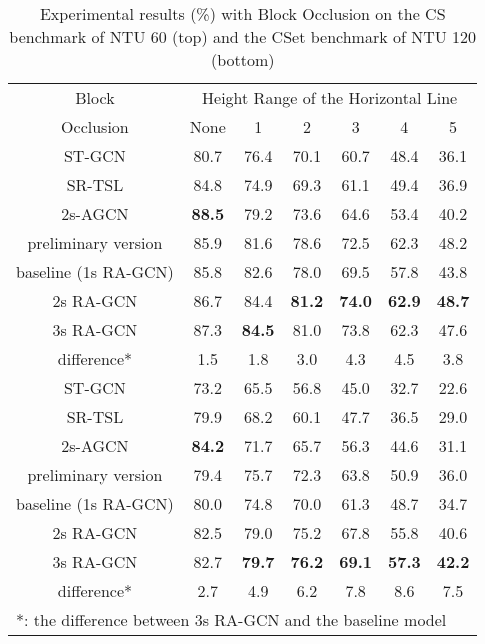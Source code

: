 \documentclass[journal]{IEEEtran}
\begin{document}
\begin{table}[t]
\caption{Experimental results (\%) with Block Occlusion on the CS benchmark of NTU 60 (top) and the CSet benchmark of NTU 120 (bottom)}
\label{tab:block}
\centering
\begin{tabular}{ccccccc}
\hline
Block & \multicolumn{6}{c}{Height Range of the Horizontal Line} \\
\cline{2-7}
Occlusion & None & 1 & 2 & 3 & 4 & 5 \\
\hline
\hline
ST-GCN \cite{yan2018spatial} & 80.7 & 76.4 & 70.1 & 60.7 & 48.4 & 36.1 \\
SR-TSL \cite{si2018skeleton} & 84.8 & 74.9 & 69.3 & 61.1 & 49.4 & 36.9 \\
2s-AGCN \cite{shi2019two} & {\bf 88.5} & 79.2 & 73.6 & 64.6 & 53.4 & 40.2 \\
preliminary version \cite{song2019richly} & 85.9 & 81.6 & 78.6 & 72.5 & 62.3 & 48.2 \\
baseline (1s RA-GCN) & 85.8 & 82.6 & 78.0 & 69.5 & 57.8 & 43.8 \\
2s RA-GCN & 86.7 & 84.4 & {\bf 81.2} & {\bf 74.0} & {\bf 62.9} & {\bf 48.7} \\
3s RA-GCN & 87.3 & {\bf 84.5} & 81.0 & 73.8 & 62.3 & 47.6 \\
difference* & 1.5 & 1.8 & 3.0 & 4.3 & 4.5 & 3.8 \\
\hline
\hline
ST-GCN \cite{yan2018spatial} & 73.2 & 65.5 & 56.8 & 45.0 & 32.7 & 22.6 \\
SR-TSL \cite{si2018skeleton} & 79.9 & 68.2 & 60.1 & 47.7 & 36.5 & 29.0 \\
2s-AGCN \cite{shi2019two} & {\bf 84.2} & 71.7 & 65.7 & 56.3 & 44.6 & 31.1 \\
preliminary version \cite{song2019richly} & 79.4 & 75.7 & 72.3 & 63.8 & 50.9 & 36.0 \\
baseline (1s RA-GCN) & 80.0 & 74.8 & 70.0 & 61.3 & 48.7 & 34.7 \\
2s RA-GCN & 82.5 & 79.0 & 75.2 & 67.8 & 55.8 & 40.6 \\
3s RA-GCN & 82.7 & {\bf 79.7} & {\bf 76.2} & {\bf 69.1} & {\bf 57.3} & {\bf 42.2} \\
difference* & 2.7 & 4.9 & 6.2 & 7.8 & 8.6 & 7.5 \\
\hline
\multicolumn{7}{l}{*: the difference between 3s RA-GCN and the baseline model}
\end{tabular}
\vspace{-0.4cm}
\end{table}
\end{document}
